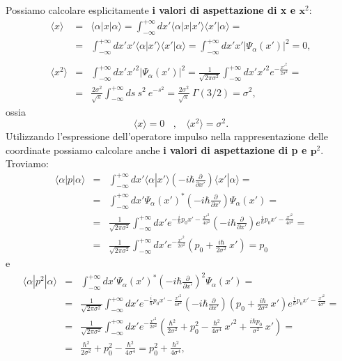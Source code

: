 \documentclass[a4paper,12pt,oneside]{book}
\begin{document}
Possiamo calcolare esplicitamente \textbf{i valori di aspettazione di x e $\mathbf x^2$}:
\begin{eqnarray}
\langle x \rangle &=& \langle \alpha | x | \alpha \rangle = \int_{-\infty}^{+\infty} dx' \langle \alpha | x | x' \rangle \langle x' | \alpha \rangle =  \nonumber \\
&=&  \int_{-\infty}^{+\infty} dx' x' \langle \alpha | x' \rangle \langle x' | \alpha \rangle = \int_{-\infty}^{+\infty} dx' x' |\Psi_\alpha (x')|^2 = 0,\\
\nonumber \\
\langle x^2 \rangle &=&  \int_{-\infty}^{+\infty} dx' x'^2 |\Psi_\alpha (x')|^2 = \frac{1}{\sqrt{2 \pi \sigma^2}} \int_{-\infty}^{+\infty} dx' x'^2 e^{- \frac{x'^2}{2 \sigma^2}} =\nonumber  \\
&=& \frac{2 \sigma^2}{\sqrt{\pi}} \int_{-\infty}^{+\infty} ds ~ s^2 ~e^{-s^2} = \frac{2 \sigma^2}{\sqrt{\pi}} ~ \Gamma(3/2) = \sigma^2,
\end{eqnarray}
ossia
\begin{equation}
\langle x \rangle = 0~~~~, ~~~~\langle x^2 \rangle = \sigma^2.
\end{equation}
Utilizzando l'espressione dell'operatore impulso nella rappresentazione delle coordinate possiamo calcolare anche \textbf{i valori di aspettazione di p e $\mathbf p^2$}. Troviamo:
\begin{eqnarray}
\langle \alpha | p | \alpha \rangle  &=&  \int_{-\infty}^{+\infty} dx' \langle \alpha | x' \rangle \left(-i \hbar \frac{\partial}{\partial x'} \right) \langle x' | \alpha \rangle = \nonumber\\
&=& \int_{-\infty}^{+\infty} dx' \Psi_\alpha(x')^* \left(-i \hbar \frac{\partial}{\partial x'} \right) \Psi_\alpha(x') = \nonumber \\
&=& \frac{1}{\sqrt{2 \pi \sigma^2}} \int_{-\infty}^{+\infty} dx' e^{-\frac{i}{\hbar}p_0 x' - \frac{x'^2}{4 \sigma^2}} \left(-i \hbar \frac{\partial}{\partial x'} \right) e^{\frac{i}{\hbar}p_0 x' - \frac{x'^2}{4 \sigma^2}} = \nonumber \\
&=& \frac{1}{\sqrt{2 \pi \sigma^2}} \int_{-\infty}^{+\infty} dx'  e^{- \frac{x'^2}{2 \sigma^2}} \left(p_0 + \frac{i \hbar}{2 \sigma^2} ~x' \right) = p_0
\end{eqnarray}
e
\begin{eqnarray}
\langle \alpha | p^2 | \alpha \rangle  &=& \int_{-\infty}^{+\infty} dx' \Psi_\alpha(x')^* \left(-i \hbar \frac{\partial}{\partial x'} \right)^2 \Psi_\alpha(x') = \nonumber \\
&=& \frac{1}{\sqrt{2 \pi \sigma^2}} \int_{-\infty}^{+\infty} dx' e^{-\frac{i}{\hbar}p_0 x' - \frac{x'^2}{4 \sigma^2}} \left(-i \hbar \frac{\partial}{\partial x'} \right)\left(p_0 + \frac{i \hbar}{2 \sigma^2} ~x' \right) e^{\frac{i}{\hbar}p_0 x' - \frac{x'^2}{4 \sigma^2}} = \nonumber \\
&=& \frac{1}{\sqrt{2 \pi \sigma^2}} \int_{-\infty}^{+\infty} dx'  e^{- \frac{x'^2}{2 \sigma^2}} \left(\frac{\hbar^2}{2 \sigma^2} + p_0^2 - \frac{\hbar^2}{4 \sigma^4}~x'^2 + \frac{i \hbar p_0}{\sigma^2}~x' \right) = \nonumber \\
&=& \frac{\hbar^2}{2 \sigma^2} + p_0^2 - \frac{\hbar^2}{4 \sigma^4} = p_0^2 + \frac{\hbar^2}{4 \sigma^4},
\end{eqnarray}
\end{document}
